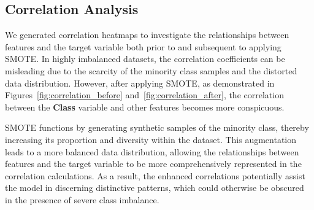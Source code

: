 \documentclass[11pt, oneside]{article}   	%
\begin{document}
\subsection{Correlation Analysis}

We generated correlation heatmaps to investigate the relationships between features and the target variable both prior to and subsequent to applying SMOTE. In highly imbalanced datasets, the correlation coefficients can be misleading due to the scarcity of the minority class samples and the distorted data distribution. However, after applying SMOTE, as demonstrated in Figures~\ref{fig:correlation_before} and~\ref{fig:correlation_after}, the correlation between the \textbf{Class} variable and other features becomes more conspicuous.

SMOTE functions by generating synthetic samples of the minority class, thereby increasing its proportion and diversity within the dataset. This augmentation leads to a more balanced data distribution, allowing the relationships between features and the target variable to be more comprehensively represented in the correlation calculations. As a result, the enhanced correlations potentially assist the model in discerning distinctive patterns, which could otherwise be obscured in the presence of severe class imbalance.
\end{document}
